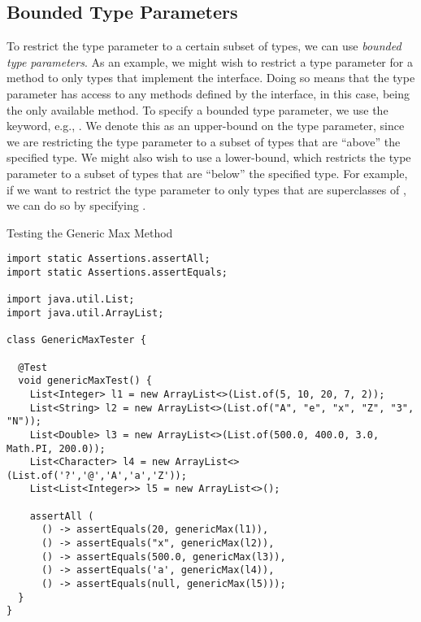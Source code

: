 \subsection*{Bounded Type Parameters}
To restrict the type parameter to a certain subset of types, we can use \textit{bounded type parameters}. As an example, we might wish to restrict a type parameter for a method to only types that implement the  interface. Doing so means that the type parameter has access to any methods defined by the interface, in this case,  being the only available method. To specify a bounded type parameter, we use the  keyword, e.g., . We denote this as an upper-bound on the type parameter, since we are restricting the type parameter to a subset of types that are ``above'' the specified type. We might also wish to use a lower-bound, which restricts the type parameter to a subset of types that are ``below'' the specified type. For example, if we want to restrict the type parameter to only types that are superclasses of , we can do so by specifying .


\begin{cl}[]{Testing the Generic Max Method}
\begin{lstlisting}[language=MyJava]
import static Assertions.assertAll;
import static Assertions.assertEquals;

import java.util.List;
import java.util.ArrayList;

class GenericMaxTester {
  
  @Test 
  void genericMaxTest() {
    List<Integer> l1 = new ArrayList<>(List.of(5, 10, 20, 7, 2));
    List<String> l2 = new ArrayList<>(List.of("A", "e", "x", "Z", "3", "N"));
    List<Double> l3 = new ArrayList<>(List.of(500.0, 400.0, 3.0, Math.PI, 200.0));
    List<Character> l4 = new ArrayList<>(List.of('?','@','A','a','Z'));
    List<List<Integer>> l5 = new ArrayList<>();

    assertAll (
      () -> assertEquals(20, genericMax(l1)),
      () -> assertEquals("x", genericMax(l2)),
      () -> assertEquals(500.0, genericMax(l3)),
      () -> assertEquals('a', genericMax(l4)),
      () -> assertEquals(null, genericMax(l5)));
  }
}
\end{lstlisting}
\end{cl}

